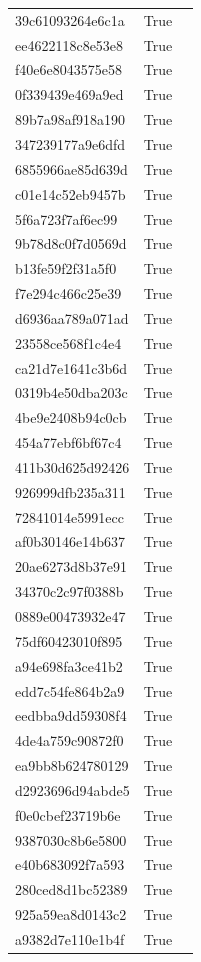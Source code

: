 \begin{tabular}{lrl}
39c61093264e6c1a & True &  \\
ee4622118c8e53e8 & True &  \\
f40e6e8043575e58 & True &  \\
0f339439e469a9ed & True &  \\
89b7a98af918a190 & True &  \\
347239177a9e6dfd & True &  \\
6855966ae85d639d & True &  \\
c01e14c52eb9457b & True &  \\
5f6a723f7af6ec99 & True &  \\
9b78d8c0f7d0569d & True &  \\
b13fe59f2f31a5f0 & True &  \\
f7e294c466c25e39 & True &  \\
d6936aa789a071ad & True &  \\
23558ce568f1c4e4 & True &  \\
ca21d7e1641c3b6d & True &  \\
0319b4e50dba203c & True &  \\
4be9e2408b94c0cb & True &  \\
454a77ebf6bf67c4 & True &  \\
411b30d625d92426 & True &  \\
926999dfb235a311 & True &  \\
72841014e5991ecc & True &  \\
af0b30146e14b637 & True &  \\
20ae6273d8b37e91 & True &  \\
34370c2c97f0388b & True &  \\
0889e00473932e47 & True &  \\
75df60423010f895 & True &  \\
a94e698fa3ce41b2 & True &  \\
edd7c54fe864b2a9 & True &  \\
eedbba9dd59308f4 & True &  \\
4de4a759c90872f0 & True &  \\
ea9bb8b624780129 & True &  \\
d2923696d94abde5 & True &  \\
f0e0cbef23719b6e & True &  \\
9387030c8b6e5800 & True &  \\
e40b683092f7a593 & True &  \\
280ced8d1bc52389 & True &  \\
925a59ea8d0143c2 & True &  \\
a9382d7e110e1b4f & True &  \\

\end{tabular}

